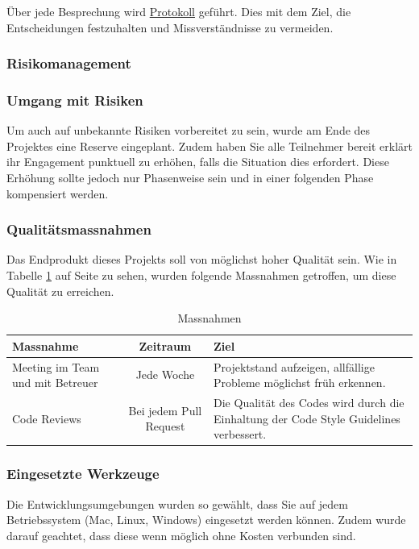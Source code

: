 Über jede Besprechung wird \href{https://github.com/BrainingOutOfBox/Doc/wiki} {Protokoll} geführt. Dies mit dem Ziel, die Entscheidungen festzuhalten und Missverständnisse zu vermeiden.

\subsubsection*{Risikomanagement}

\subsubsection*{Umgang mit Risiken}
Um auch auf unbekannte Risiken vorbereitet zu sein, wurde am Ende des Projektes eine Reserve eingeplant. Zudem haben Sie alle Teilnehmer bereit erklärt ihr Engagement punktuell zu erhöhen, falls die Situation dies erfordert. Diese Erhöhung sollte jedoch nur Phasenweise sein und in einer folgenden Phase kompensiert werden.

\subsubsection*{Qualitätsmassnahmen}
Das Endprodukt dieses Projekts soll von möglichst hoher Qualität sein. Wie in Tabelle \ref{tab:Massnahmen} auf Seite \pageref{tab:Massnahmen} zu sehen, wurden folgende Massnahmen getroffen, um diese Qualität zu erreichen.

\renewcommand{\arraystretch}{2}
\begin{table}
  \begin{tabular}{ p{3cm} | c | p{5cm} }
    Massnahme			& Zeitraum	 	& Ziel \\
    \hline
    Meeting im Team und mit Betreuer & Jede Woche & Projektstand aufzeigen, allfällige Probleme möglichst früh erkennen.\\
    \hline
    Code Reviews & Bei jedem Pull Request & Die Qualität des Codes wird durch die Einhaltung der Code Style Guidelines verbessert.
  \end{tabular}
  \caption[Projektplan]{Massnahmen}
  \label{tab:Massnahmen}
\end{table}

\subsubsection*{Eingesetzte Werkzeuge}
Die Entwicklungsumgebungen wurden so gewählt, dass Sie auf jedem Betriebssystem (Mac, Linux, Windows) eingesetzt werden können. Zudem wurde darauf geachtet, dass diese wenn möglich ohne Kosten verbunden sind.


